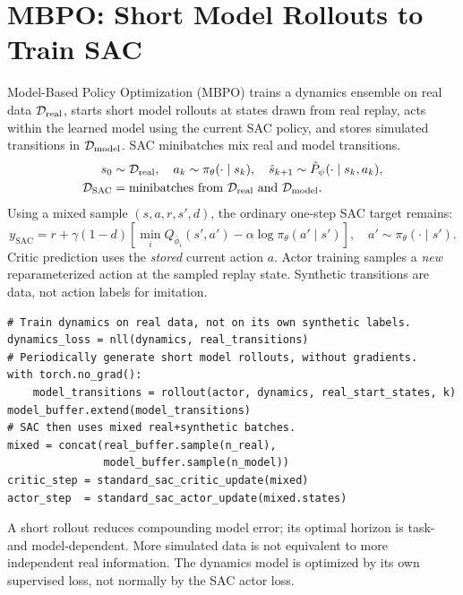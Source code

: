 \section{MBPO: Short Model Rollouts to Train SAC}
Model-Based Policy Optimization (MBPO) trains a dynamics ensemble on real data $\mathcal{D}_{\mathrm{real}}$, starts short model rollouts at states drawn from real replay, acts within the learned model using the current SAC policy, and stores simulated transitions in $\mathcal{D}_{\mathrm{model}}$. SAC minibatches mix real and model transitions.
\begin{align}
s_0&\sim\mathcal{D}_{\mathrm{real}},\quad
a_k\sim\pi_\theta(\cdot\mid s_k),\quad
\hat s_{k+1}\sim\hat P_\psi(\cdot\mid s_k,a_k),\\
\mathcal{D}_{\mathrm{SAC}}&=\text{minibatches from }
\mathcal{D}_{\mathrm{real}}\text{ and }\mathcal{D}_{\mathrm{model}}.
\end{align}
Using a mixed sample $(s,a,r,s',d)$, the ordinary one-step SAC target remains:
\begin{equation}
y_{\mathrm{SAC}}=
r+\gamma(1-d)\left[
\min_iQ_{\bar\phi_i}(s',a')
-\alpha\log\pi_\theta(a'\mid s')\right],
\quad a'\sim\pi_\theta(\cdot\mid s').
\end{equation}
Critic prediction uses the \emph{stored} current action $a$. Actor training samples a \emph{new} reparameterized action at the sampled replay state. Synthetic transitions are data, not action labels for imitation.
\begin{verbatim}
# Train dynamics on real data, not on its own synthetic labels.
dynamics_loss = nll(dynamics, real_transitions)
# Periodically generate short model rollouts, without gradients.
with torch.no_grad():
    model_transitions = rollout(actor, dynamics, real_start_states, k)
model_buffer.extend(model_transitions)
# SAC then uses mixed real+synthetic batches.
mixed = concat(real_buffer.sample(n_real),
               model_buffer.sample(n_model))
critic_step = standard_sac_critic_update(mixed)
actor_step  = standard_sac_actor_update(mixed.states)
\end{verbatim}
A short rollout reduces compounding model error; its optimal horizon is task- and model-dependent. More simulated data is not equivalent to more independent real information. The dynamics model is optimized by its own supervised loss, not normally by the SAC actor loss.

